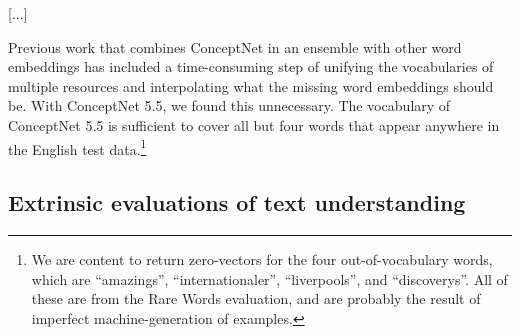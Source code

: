 \documentclass[letterpaper]{article}
\begin{document}
[...]

Previous work that combines ConceptNet in an ensemble with other word
embeddings \cite{speer2016ensemble} has included a time-consuming step of
unifying the vocabularies of multiple resources and interpolating what the
missing word embeddings should be. With ConceptNet 5.5, we found this
unnecessary.  The vocabulary of ConceptNet 5.5 is sufficient to cover all but
four words that appear anywhere in the English test data.\footnote{We are
content to return zero-vectors for the four out-of-vocabulary words, which are
``amazings'', ``internationaler'', ``liverpools'', and ``discoverys''. All of
these are from the Rare Words evaluation, and are probably the result of
imperfect machine-generation of examples.}

\subsection{Extrinsic evaluations of text understanding}
\label{extrinsic-evaluations}


%




\end{document}
